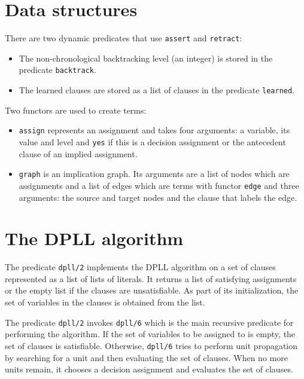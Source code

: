 \documentclass[11pt]{report}
\newcommand*{\p}[1]{\textup{\texttt{#1}}}
\begin{document}
\newpage

\section{Data structures}

There are two dynamic predicates that use \p{assert} and \p{retract}:
\begin{itemize}
\item The non-chronological backtracking level (an integer) is stored in the
predicate \p{backtrack}.

\item The learned clauses are stored as a list of
clauses in the predicate \p{learned}.
\end{itemize}

Two functors are used to create terms:
\begin{itemize}

\item \p{assign} represents an assignment and takes four arguments: a
variable, its value and level and \p{yes} if this is a decision
assignment or the antecedent clause of an implied assignment.

\item \p{graph} is an implication graph. Its arguments are a list of
nodes which are assignments and a list of edges which are terms with
functor \p{edge} and three arguments: the source and target nodes
and the clause that labels the edge.
\end{itemize}


\section{The DPLL algorithm}

The predicate \p{dpll/2} implements the DPLL algorithm on a set of
clauses represented as a list of lists of literals. It returns a list of
satisfying assignments or the empty list if the clauses are
unsatisfiable. As part of its initialization, the set of variables in
the clauses is obtained from the list.

The predicate \p{dpll/2} invokes \p{dpll/6} which is the main recursive
predicate for performing the algorithm. If the set of variables to be
assigned to is empty, the set of clauses is satisfiable. Otherwise,
\p{dpll/6} tries to perform unit propagation by searching for a unit and
then evaluating the set of clauses. When no more units remain, it
chooses a decision assignment and evaluates the set of clauses.
\end{document}
